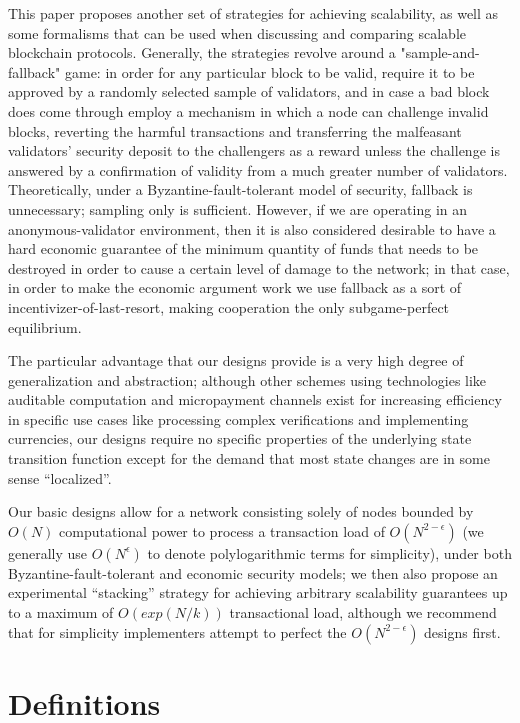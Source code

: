 \documentclass[11pt,a4paper]{report}
\theoremstyle{plain}
\theoremstyle{definition}
\theoremstyle{remark}
\begin{document}
This paper proposes another set of strategies for achieving scalability, as well as some formalisms that can be used when discussing and comparing scalable blockchain protocols. Generally, the strategies revolve around a "sample-and-fallback" game: in order for any particular block to be valid, require it to be approved by a randomly selected sample of validators, and in case a bad block does come through employ a mechanism in which a node can challenge invalid blocks, reverting the harmful transactions and transferring the malfeasant validators' security deposit to the challengers as a reward unless the challenge is answered by a confirmation of validity from a much greater number of validators. Theoretically, under a Byzantine-fault-tolerant model of security, fallback is unnecessary; sampling only is sufficient. However, if we are operating in an anonymous-validator environment, then it is also considered desirable to have a hard economic guarantee of the minimum quantity of funds that needs to be destroyed in order to cause a certain level of damage to the network; in that case, in order to make the economic argument work we use fallback as a sort of incentivizer-of-last-resort, making cooperation the only subgame-perfect equilibrium.

The particular advantage that our designs provide is a very high degree of generalization and abstraction; although other schemes using technologies like auditable computation\citep{buterin_scalability_2014} and micropayment channels\citep{poon_bitcoin_2015} exist for increasing efficiency in specific use cases like processing complex verifications and implementing currencies, our designs require no specific properties of the underlying state transition function except for the demand that most state changes are in some sense ``localized''.

Our basic designs allow for a network consisting solely of nodes bounded by $O(N)$ computational power to process a transaction load of $O(N^{2-\epsilon})$ (we generally use $O(N^\epsilon)$ to denote polylogarithmic terms for simplicity), under both Byzantine-fault-tolerant and economic security models; we then also propose an experimental ``stacking'' strategy for achieving arbitrary scalability guarantees up to a maximum of $O(exp(N/k))$ transactional load, although we recommend that for simplicity implementers attempt to perfect the $O(N^{2-\epsilon})$ designs first.

\chapter{Definitions}
\end{document}
